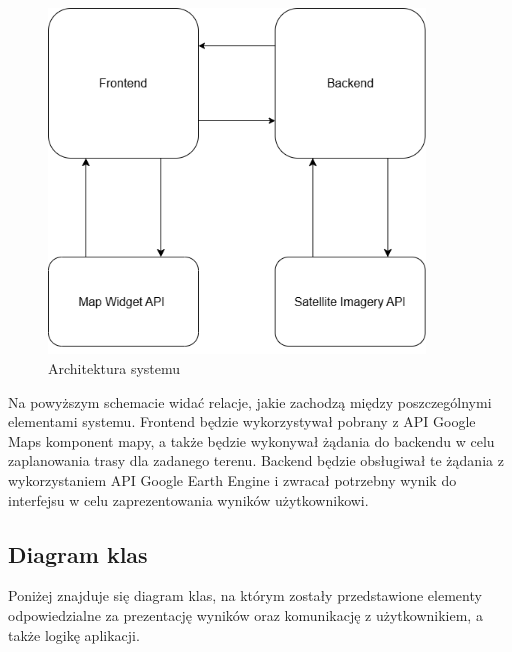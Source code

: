 \begin{figure}[H]
    \centering
    \includegraphics[width=10cm]{images/Architektura_systemu.png}
    \caption{Architektura systemu}
\end{figure}

Na powyższym schemacie widać relacje, jakie zachodzą między poszczególnymi elementami systemu. Frontend będzie wykorzystywał pobrany z API Google Maps komponent mapy, a także będzie wykonywał żądania do backendu w celu zaplanowania trasy dla zadanego terenu. Backend będzie obsługiwał te żądania z wykorzystaniem API Google Earth Engine i zwracał potrzebny wynik do interfejsu w celu zaprezentowania wyników użytkownikowi.

\subsection{Diagram klas}

Poniżej znajduje się diagram klas, na którym zostały przedstawione elementy odpowiedzialne za prezentację wyników oraz komunikację z użytkownikiem, a także logikę aplikacji.

